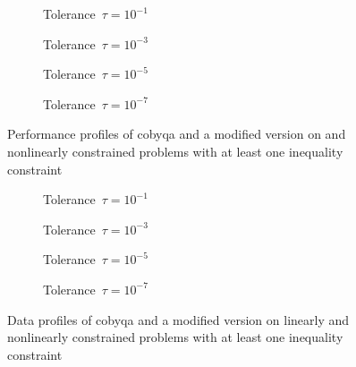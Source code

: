 \begin{figure}[ht]
    \centering
    \begin{subfigure}[b]{0.49\textwidth}
        \centering
        \caption{Tolerance~$\tau = 10^{-1}$}
    \end{subfigure}
    \hfill
    \begin{subfigure}[b]{0.49\textwidth}
        \centering
        \caption{Tolerance~$\tau = 10^{-3}$}
    \end{subfigure}
    \begin{subfigure}[b]{0.49\textwidth}
        \centering
        \caption{Tolerance~$\tau = 10^{-5}$}
    \end{subfigure}
    \hfill
    \begin{subfigure}[b]{0.49\textwidth}
        \centering
        \caption{Tolerance~$\tau = 10^{-7}$}
    \end{subfigure}
    \caption[Performance profiles of our new Byrd-Omojokun approach]{Performance profiles of \gls{cobyqa} and a modified version on  and nonlinearly constrained problems with at least one inequality constraint}
    \label{fig:perf-byrd-omojokun}
\end{figure}

\begin{figure}[ht]
    \centering
    \begin{subfigure}[b]{0.49\textwidth}
        \centering
        \caption{Tolerance~$\tau = 10^{-1}$}
    \end{subfigure}
    \hfill
    \begin{subfigure}[b]{0.49\textwidth}
        \centering
        \caption{Tolerance~$\tau = 10^{-3}$}
    \end{subfigure}
    \begin{subfigure}[b]{0.49\textwidth}
        \centering
        \caption{Tolerance~$\tau = 10^{-5}$}
    \end{subfigure}
    \hfill
    \begin{subfigure}[b]{0.49\textwidth}
        \centering
        \caption{Tolerance~$\tau = 10^{-7}$}
    \end{subfigure}
    \caption[Data profiles of our new Byrd-Omojokun approach]{Data profiles of \gls{cobyqa} and a modified version on linearly and nonlinearly constrained problems with at least one inequality constraint}
    \label{fig:data-byrd-omojokun}
\end{figure}

